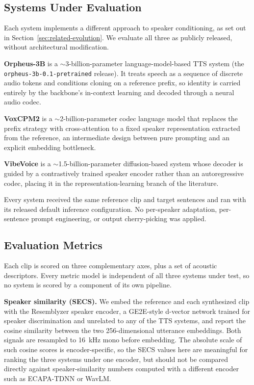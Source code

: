 \documentclass[conference]{IEEEtran}
\begin{document}
\subsection{Systems Under Evaluation}
\label{sec:method-systems}

Each system implements a different approach to speaker conditioning, as set
out in Section~\ref{sec:related-evolution}. We evaluate all three as publicly
released, without architectural modification.

\textbf{Orpheus-3B} is a $\sim$3-billion-parameter language-model-based TTS
system (the \texttt{orpheus-3b-0.1-pretrained} release). It treats speech as
a sequence of discrete audio tokens and conditions cloning on a reference
prefix, so identity is carried entirely by the backbone's in-context learning
and decoded through a neural audio codec.

\textbf{VoxCPM2} is a $\sim$2-billion-parameter codec language model that
replaces the prefix strategy with cross-attention to a fixed speaker
representation extracted from the reference, an intermediate design between
pure prompting and an explicit embedding bottleneck.

\textbf{VibeVoice} is a $\sim$1.5-billion-parameter diffusion-based system
whose decoder is guided by a contrastively trained speaker encoder rather
than an autoregressive codec, placing it in the representation-learning
branch of the literature.

Every system received the same reference clip and target sentences and ran
with its released default inference configuration. No per-speaker adaptation,
per-sentence prompt engineering, or output cherry-picking was applied.

\subsection{Evaluation Metrics}
\label{sec:method-metrics}

Each clip is scored on three complementary axes, plus a set of acoustic
descriptors. Every metric model is independent of all three systems under
test, so no system is scored by a component of its own pipeline.

\textbf{Speaker similarity (SECS).} We embed the reference and each
synthesized clip with the Resemblyzer speaker encoder, a GE2E-style d-vector
network \cite{variani2014deep} trained for speaker discrimination and
unrelated to any of the TTS systems, and report the cosine similarity between
the two 256-dimensional utterance embeddings. Both signals are resampled to
16~kHz mono before embedding. The absolute scale of such cosine scores is
encoder-specific, so the SECS values here are meaningful for ranking the
three systems under one encoder, but should not be compared directly against
speaker-similarity numbers computed with a different encoder such as
ECAPA-TDNN or WavLM.
\end{document}
